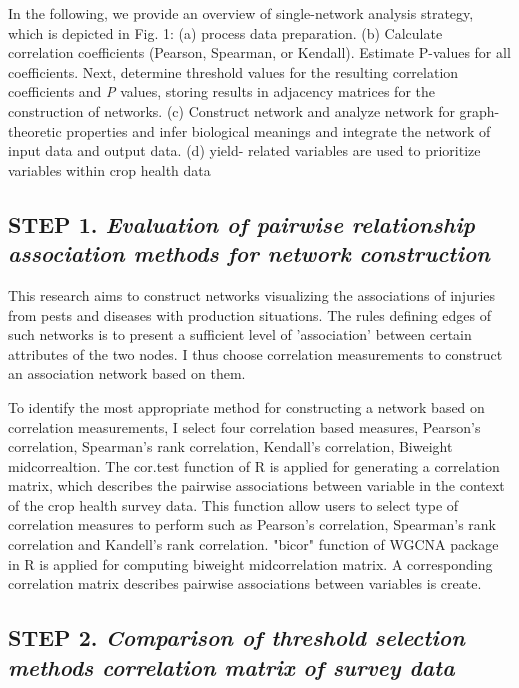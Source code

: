 In the following, we provide an overview of single-network analysis strategy, which is depicted in Fig. 1: (a) process data preparation. (b) Calculate correlation coefficients (Pearson, Spearman, or Kendall). Estimate P-values for all coefficients. Next, determine threshold values for the resulting correlation coefficients and \textit{P} values, storing results in adjacency matrices for the construction of networks. (c) Construct network and analyze network for graph-theoretic properties and infer biological meanings and integrate the network of input data and output data. (d) yield- related variables are used to prioritize variables within crop health data


\subsection*{\textbf{STEP 1. }\textit{Evaluation of pairwise relationship association methods for network construction}}


This research aims to construct networks visualizing the associations of injuries from pests and diseases with production situations. The rules defining edges of such networks is to present a sufficient level of 'association' between certain attributes of the two nodes. I thus choose correlation measurements to construct an association network based on them.

To identify the most appropriate method for constructing a network based on correlation measurements, I select four correlation based measures, Pearson's correlation, Spearman's rank correlation, Kendall's correlation, Biweight midcorrealtion. The cor.test function of R  is applied for generating a correlation matrix, which describes the pairwise associations between variable in the context of the crop health survey data. This function allow users to select type of correlation measures to perform such as Pearson's correlation, Spearman's rank correlation and Kandell's rank correlation. "bicor" function of WGCNA package  in R is applied for computing biweight midcorrelation matrix. A corresponding correlation matrix describes pairwise associations between variables is create. %


\subsection*{\textbf{STEP 2. }\textit{Comparison of threshold selection methods correlation matrix of survey data}} %

